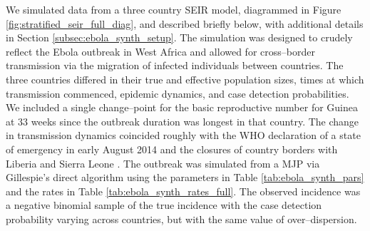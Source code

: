 We simulated data from a three country SEIR model, diagrammed in Figure \ref{fig:stratified_seir_full_diag}, and described briefly below, with additional details in Section \ref{subsec:ebola_synth_setup}. The simulation was designed to crudely reflect the Ebola outbreak in West Africa and allowed for cross--border transmission via the migration of infected individuals between countries. The three countries differed in their true and effective population sizes, times at which transmission commenced, epidemic dynamics, and case detection probabilities. We included a single change--point for the basic reproductive number for Guinea at 33 weeks since the outbreak duration was longest in that country. The change in transmission dynamics coincided roughly with the WHO declaration of a state of emergency in early August 2014 and the closures of country borders with Liberia and Sierra Leone \cite{coltart2017ebola}. The outbreak was simulated from a MJP via Gillespie's direct algorithm \cite{gillespie1976general} using the parameters in Table \ref{tab:ebola_synth_pars} and the rates in Table \ref{tab:ebola_synth_rates_full}. The observed incidence was a negative binomial sample of the true incidence with the case detection probability varying across countries, but with the same value of over--dispersion.

